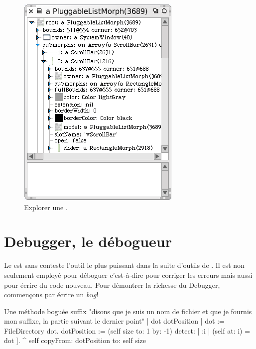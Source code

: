 \documentclass[a4paper,10pt,twoside]{book}
\begin{document}
\begin{figure}[tbp]
	\begin{center}
		\includegraphics[scale=0.7]{explorePluggableListMorph}
	\end{center}
	\caption{Explorer une .}
	\label{fig:explorePluggableListMorph}
\end{figure}

\section{Debugger, le d\'ebogueur}
\label{sec:debugger} %

Le   est sans conteste l'outil le plus
puissant dans la suite d'outils de \sq. 
Il est non seulement employ\'e pour d\'eboguer c'est-à-dire pour corriger les erreurs
mais aussi pour \'ecrire du code nouveau.
Pour d\'emontrer la richesse du Debugger, commen\c{c}ons par
\'ecrire un \emph{bug}!


\needspace{10ex}
\begin{method}[buggy]{Une m\'ethode bogu\'ee}
suffix
	"disons que je suis un nom de fichier et que je fournis mon suffixe, la partie suivant le dernier point"
	| dot dotPosition |
	dot := FileDirectory dot.
	dotPosition := (self size to: 1 by: -1) detect: [ :i | (self at: i) = dot ].
	^ self copyFrom: dotPosition to: self size 
\end{method}
\end{document}
